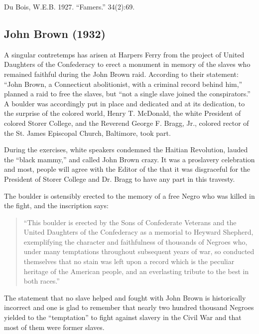 \documentclass[letterpaper,10pt,english]{jupyterBook}
\begin{document}
\sphinxAtStartPar
{} Du Bois, W.E.B. 1927. “Famers.”  34(2):69.


\subsection{John Brown (1932)}
\label{\detokenize{Volumes/39/01/john_brown:john-brown-1932}}\label{\detokenize{Volumes/39/01/john_brown::doc}}
\sphinxAtStartPar
A singular contretemps has arisen at Harpers Ferry from the project of United Daughters of the Confederacy to erect a monument in memory of the slaves who remained faithful during the John Brown raid. According to their statement: “John Brown, a Connecticut abolitionist, with a criminal record behind him,” planned a raid to free the slaves, but “not a single slave joined the conspirators.” A boulder was accordingly put in place and dedicated and at its dedication, to the surprise of the colored world, Henry T. McDonald, the white President of colored Storer College, and the Reverend George F. Bragg, Jr., colored rector of the St. James Episcopal Church, Baltimore, took part.

\sphinxAtStartPar
During the exercises, white speakers condemned the Haitian Revolution, lauded the “black mammy,” and called John Brown crazy. It was a pro\sphinxhyphen{}slavery celebration and most, people will agree with the Editor of the  that it was disgraceful for the President of Storer College and Dr. Bragg to have any part in this travesty.

\sphinxAtStartPar
The boulder is ostensibly erected to the memory of a free Negro who was killed in the fight, and the inscription says:
\begin{quote}

\sphinxAtStartPar
“This boulder is erected by the Sons of Confederate Veterans and the United Daughters of the Confederacy as a memorial to Heyward Shepherd, exemplifying the character and faithfulness of thousands of Negroes who, under many temptations throughout subsequent years of war, so conducted themselves that no stain was left upon a record which is the peculiar heritage of the American people, and an everlasting tribute to the best in both races.”
\end{quote}

\sphinxAtStartPar
The statement that no slave helped and fought with John Brown is historically incorrect and one is glad to remember that nearly two hundred thousand Negroes yielded to the “temptation” to fight against slavery in the Civil War and that most of them were former slaves.
\end{document}
